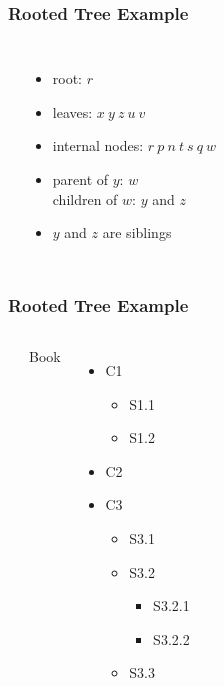 \documentclass[dvipsnames]{beamer}
\begin{document}
\begin{frame}
  \frametitle{Rooted Tree Example}

  \begin{columns}
    \begin{center}
    \end{center}

    \begin{itemize}
      \item root: $r$
      \item leaves: $x ~ y ~ z ~ u ~ v$
      \item internal nodes: $r ~ p ~ n ~ t ~ s ~ q ~ w$
      \item parent of $y$: $w$\\
        children of $w$: $y$ and $z$\\
      \item $y$ and $z$ are siblings
    \end{itemize}
  \end{columns}
\end{frame}

\begin{frame}
  \frametitle{Rooted Tree Example}

  \begin{columns}
    \begin{center}
    \end{center}

    Book
    \begin{itemize}
      \item C1
      \begin{itemize}
        \item S1.1
        \item S1.2
      \end{itemize}
      \item C2
      \item C3
      \begin{itemize}
        \item S3.1
        \item S3.2
        \begin{itemize}
          \item S3.2.1
          \item S3.2.2
        \end{itemize}
        \item S3.3
      \end{itemize}
    \end{itemize}
  \end{columns}
\end{frame}
\end{document}
